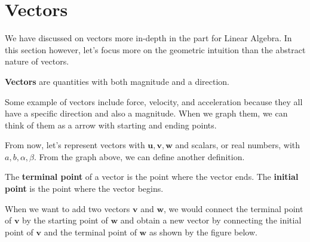 \documentclass[../../main.tex]{subfiles}
\begin{document}
\section{Vectors}

We have discussed on vectors more in-depth in the part for Linear
Algebra. In this section however, let's focus more on the geometric
intuition than the abstract nature of vectors.

\begin{definition}{}{}
\textbf{Vectors} are quantities with both magnitude and a direction.
\end{definition}

Some example of vectors include force, velocity, and acceleration
because they all have a specific direction and also a magnitude.
When we graph them, we can think of them as a arrow with starting
and ending points.

\begin{figure}[H]
\centering
{}
\end{figure}

From now, let's represent vectors with $\mathbf{u}, \mathbf{v},
\mathbf{w}$ and scalars, or real numbers, with $a, b, \alpha, \beta$.
From the graph above, we can define another definition.

\begin{definition}{}{}
The \textbf{terminal point} of a vector is the point where the vector
ends. The \textbf{initial point} is the point where the vector begins.
\end{definition}

When we want to add two vectors $\mathbf{v}$ and $\mathbf{w}$,
we would connect the terminal point of $\mathbf{v}$ by the starting
point of $\mathbf{w}$ and obtain a new vector by connecting the
initial point of $\mathbf{v}$ and the terminal point of $\mathbf{w}$
as shown by the figure below.
\end{document}
